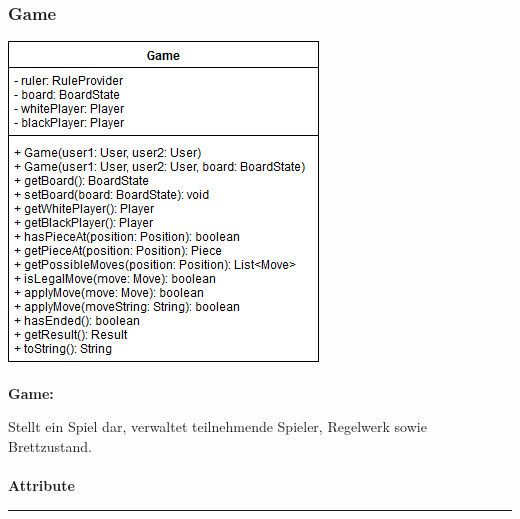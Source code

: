 \documentclass[parskip=full]{scrartcl}
\begin{document}
		\subsubsection{Game}
		\begin{minipage}{\linewidth}
			\centering
			\includegraphics[width=1\linewidth]{Diagramme/Game}
			\label{fig:game}
		\end{minipage}
		
			\textbf{\Large{Game:}}
			
			Stellt ein Spiel dar, verwaltet teilnehmende Spieler, Regelwerk sowie Brettzustand. \\
				\\
				\textbf{\large{Attribute}}
				\newline
				\rule{\textwidth}{1pt}
				
\end{document}
